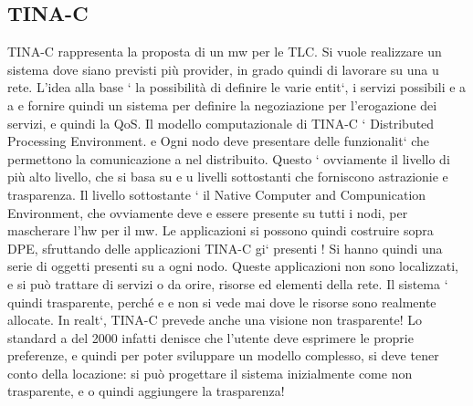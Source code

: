 \documentclass[a4paper,12pt]{article}
\begin{document}
\subsection{TINA-C}
TINA-C rappresenta la proposta di un mw per le TLC. Si vuole realizzare un
sistema dove siano previsti più provider, in grado quindi di lavorare su una
u
rete. L'idea alla base ` la possibilità di definire le varie entit`, i servizi possibili
e
a
a
e fornire quindi un sistema per definire la negoziazione per l'erogazione dei
servizi, e quindi la QoS.
Il modello computazionale di TINA-C ` Distributed Processing Environment.
e
Ogni nodo deve presentare delle funzionalit` che permettono la comunicazione
a
nel distribuito. Questo ` ovviamente il livello di più alto livello, che si basa su
e
u
livelli sottostanti che forniscono astrazionie e trasparenza. Il livello sottostante
` il Native Computer and Compunication Environment, che ovviamente deve
e
essere presente su tutti i nodi, per mascherare l'hw per il mw.
Le applicazioni si possono quindi costruire sopra DPE, sfruttando delle applicazioni TINA-C gi` presenti ! Si hanno
quindi una serie di oggetti presenti su
a
ogni nodo. Queste applicazioni non sono localizzati, e si può trattare di servizi
o
da orire, risorse ed elementi della rete. Il sistema ` quindi trasparente, perché
e
e
non si vede mai dove le risorse sono realmente allocate.
In realt`, TINA-C prevede anche una visione non trasparente! Lo standard
a
del 2000 infatti denisce che l'utente deve esprimere le proprie preferenze, e
quindi per poter sviluppare un modello complesso, si deve tener conto della
locazione: si può progettare il sistema inizialmente come non trasparente, e
o
quindi aggiungere la trasparenza!
\end{document}
